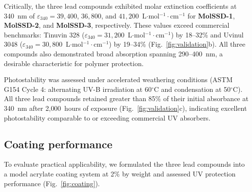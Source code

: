 \documentclass[11pt]{article}
\newcommand{\molssd}{\textsc{MolSSD}}
\begin{document}
Critically, the three lead compounds exhibited molar extinction coefficients at 340~nm of $\varepsilon_{340} = 39{,}400$, $36{,}800$, and $41{,}200$~L$\cdot$mol$^{-1}\cdot$cm$^{-1}$ for \textbf{MolSSD-1}, \textbf{MolSSD-2}, and \textbf{MolSSD-3}, respectively. These values exceed commercial benchmarks: Tinuvin 328 ($\varepsilon_{340} = 31{,}200$~L$\cdot$mol$^{-1}\cdot$cm$^{-1}$) by 18--32\% and Uvinul 3048 ($\varepsilon_{340} = 30{,}800$~L$\cdot$mol$^{-1}\cdot$cm$^{-1}$) by 19--34\% (Fig.~\ref{fig:validation}b). All three compounds also demonstrated broad absorption spanning 290--400~nm, a desirable characteristic for polymer protection.

Photostability was assessed under accelerated weathering conditions (ASTM G154 Cycle 4: alternating UV-B irradiation at 60$^\circ$C and condensation at 50$^\circ$C). All three lead compounds retained greater than 85\% of their initial absorbance at 340~nm after 2{,}000~hours of exposure (Fig.~\ref{fig:validation}c), indicating excellent photostability comparable to or exceeding commercial UV absorbers.


\subsection*{Coating performance}

To evaluate practical applicability, we formulated the three lead compounds into a model acrylate coating system at 2\% by weight and assessed UV protection performance (Fig.~\ref{fig:coating}).

\begin{table}[t]
    \centering
    \caption{\textbf{UV absorber performance comparison.} Properties of \molssd{}-generated UV absorbers compared to commercial benchmarks. $\varepsilon_{340}$: molar extinction coefficient at 340~nm. $\Delta E^*_{2000h}$: total colour change of protected coating after 2{,}000 hours of accelerated weathering (lower is better). Gloss retention: percentage of initial 60$^\circ$ gloss retained after 2{,}000 hours.}
    \label{tab:coating}
    \vspace{0.3cm}
\end{table}
\end{document}
